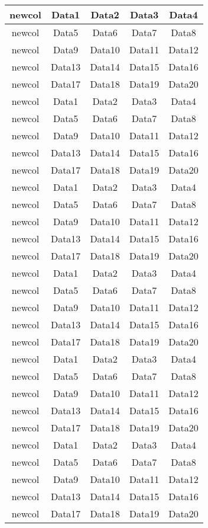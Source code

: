 \begin{longtable}{|c|c|c|c|c|}
    newcol & Data1 & Data2 & Data3 & Data4 \\  \hline
    newcol & Data5 & Data6 & Data7 & Data8 \\ \hline
    newcol & Data9 & Data10 & Data11 & Data12 \\ \hline
    newcol & Data13 & Data14 & Data15 & Data16 \\ \hline
    newcol & Data17 & Data18 & Data19 & Data20 \\ \hline
    newcol & Data1 & Data2 & Data3 & Data4 \\  \hline
    newcol & Data5 & Data6 & Data7 & Data8 \\ \hline
    newcol & Data9 & Data10 & Data11 & Data12 \\ \hline
    newcol & Data13 & Data14 & Data15 & Data16 \\ \hline
    newcol & Data17 & Data18 & Data19 & Data20 \\ \hline
    newcol & Data1 & Data2 & Data3 & Data4 \\  \hline
    newcol & Data5 & Data6 & Data7 & Data8 \\ \hline
    newcol & Data9 & Data10 & Data11 & Data12 \\ \hline
    newcol & Data13 & Data14 & Data15 & Data16 \\ \hline
    newcol & Data17 & Data18 & Data19 & Data20 \\ \hline
    newcol & Data1 & Data2 & Data3 & Data4 \\  \hline
    newcol & Data5 & Data6 & Data7 & Data8 \\ \hline
    newcol & Data9 & Data10 & Data11 & Data12 \\ \hline
    newcol & Data13 & Data14 & Data15 & Data16 \\ \hline
    newcol & Data17 & Data18 & Data19 & Data20 \\ \hline
    newcol & Data1 & Data2 & Data3 & Data4 \\  \hline
    newcol & Data5 & Data6 & Data7 & Data8 \\ \hline
    newcol & Data9 & Data10 & Data11 & Data12 \\ \hline
    newcol & Data13 & Data14 & Data15 & Data16 \\ \hline
    newcol & Data17 & Data18 & Data19 & Data20 \\ \hline
    newcol & Data1 & Data2 & Data3 & Data4 \\  \hline
    newcol & Data5 & Data6 & Data7 & Data8 \\ \hline
    newcol & Data9 & Data10 & Data11 & Data12 \\ \hline
    newcol & Data13 & Data14 & Data15 & Data16 \\ \hline
    newcol & Data17 & Data18 & Data19 & Data20 \\ 

\end{longtable}


